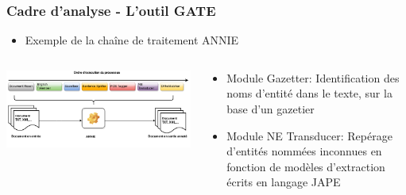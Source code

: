 \documentclass[10pt, compress]{beamer}
\begin{document}
\begin{frame}[fragile]
\frametitle{Cadre d'analyse - L'outil GATE}
\begin{itemize}
[square]
	\item{Exemple de la chaîne de traitement ANNIE}
\end{itemize}
	\begin{columns}
		\includegraphics[scale=0.2]{img/annieChaine.png} 
	\onslide<1>
	\begin{scriptsize}
		\begin{itemize}
			\item{Module Gazetter: Identification des noms d'entité dans le texte, sur la base d'un gazetier}
			\item{Module NE Transducer: Repérage d'entités nommées inconnues en fonction de modèles d'extraction écrits en langage JAPE}
		\end{itemize}
	\end{scriptsize}
	\end{columns}
\end{frame}
\end{document}
